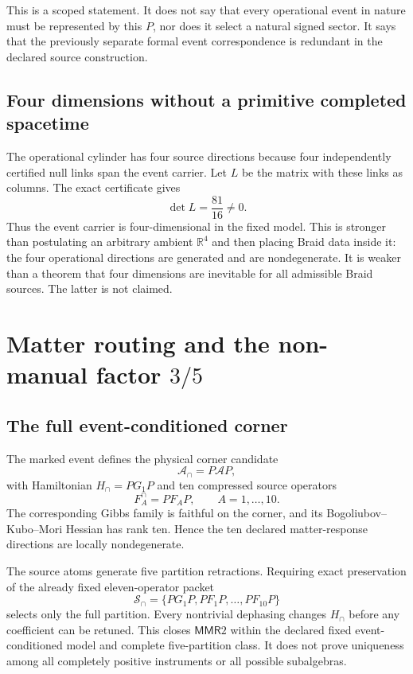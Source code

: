 \documentclass[11pt]{article}
\theoremstyle{definition}
\theoremstyle{remark}
\newcommand{\cA}{\mathcal{A}}
\newcommand{\cS}{\mathcal{S}}
\newcommand{\MMR}{\mathsf{MMR}}
\begin{document}
This is a scoped statement. It does not say that every operational event in nature must be represented by this $P$, nor does it select a natural signed sector. It says that the previously separate formal event correspondence is redundant in the declared source construction.

\subsection{Four dimensions without a primitive completed spacetime}

The operational cylinder has four source directions because four independently certified null links span the event carrier. Let $L$ be the matrix with these links as columns. The exact certificate gives
\begin{equation}
 \det L=\frac{81}{16}\neq0.
\end{equation}
Thus the event carrier is four-dimensional in the fixed model. This is stronger than postulating an arbitrary ambient $\mathbb R^4$ and then placing Braid data inside it: the four operational directions are generated and are nondegenerate. It is weaker than a theorem that four dimensions are inevitable for all admissible Braid sources. The latter is not claimed.

\section{Matter routing and the non-manual factor $3/5$}

\subsection{The full event-conditioned corner}

The marked event defines the physical corner candidate
\begin{equation}
 \cA_{\cap}=P\cA P,
\end{equation}
with Hamiltonian $H_{\cap}=PG_1P$ and ten compressed source operators
\begin{equation}
 F_A^{\cap}=PF_AP,\qquad A=1,\ldots,10.
\end{equation}
The corresponding Gibbs family is faithful on the corner, and its Bogoliubov--Kubo--Mori Hessian has rank ten. Hence the ten declared matter-response directions are locally nondegenerate.

The source atoms generate five partition retractions. Requiring exact preservation of the already fixed eleven-operator packet
\begin{equation}
 \cS_{\cap}=\{PG_1P,PF_1P,\ldots,PF_{10}P\}
\end{equation}
selects only the full partition. Every nontrivial dephasing changes $H_{\cap}$ before any coefficient can be retuned. This closes $\MMR2$ within the declared fixed event-conditioned model and complete five-partition class. It does not prove uniqueness among all completely positive instruments or all possible subalgebras.
\end{document}
